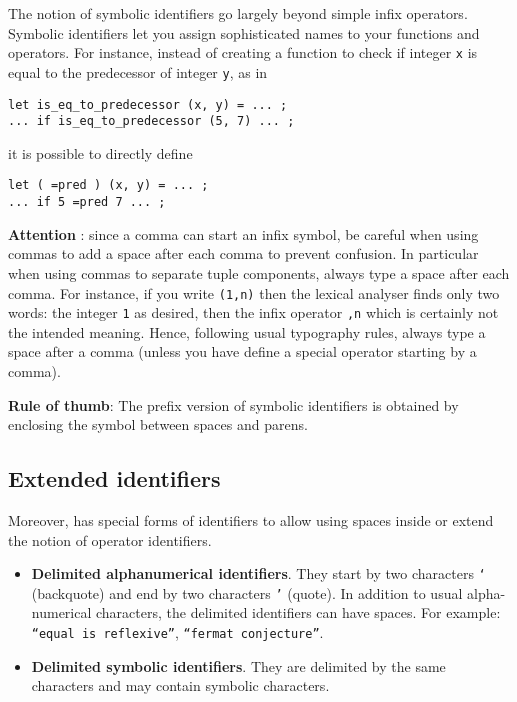 The {\focal} notion of symbolic identifiers go largely beyond simple
infix operators. Symbolic identifiers let you assign sophisticated names
to your functions and operators.
For instance, instead of creating a function to check if integer {\tt x}
is equal to the predecessor of integer {\tt y}, as in
{\scriptsize
\begin{lstlisting}
let is_eq_to_predecessor (x, y) = ... ;
... if is_eq_to_predecessor (5, 7) ... ;
\end{lstlisting}
}
it is possible to directly define
{\scriptsize
\begin{lstlisting}
let ( =pred ) (x, y) = ... ;
... if 5 =pred 7 ... ;
\end{lstlisting}
}

{\bf Attention} : since a comma can start an infix symbol, be careful
when using commas to add a space after each comma to prevent confusion.
In particular when using commas to separate tuple components, always type
a space after each comma. For instance, if you write {\tt (1,n)}
then the lexical analyser finds only two words: the integer {\tt 1} as
desired, then the infix operator {\tt ,n} which is certainly not the
intended meaning. Hence, following usual typography rules, always type a
space after a comma (unless you have define a special operator starting
by a comma).

{\bf Rule of thumb}: The prefix version of symbolic identifiers is obtained by enclosing the
symbol between spaces and parens.

\subsection{Extended identifiers}
\label{extended-identifiers}

Moreover, {\focal} has special forms of identifiers to allow using
spaces inside or extend the notion of operator identifiers.
\begin{itemize}
  \item {\bf Delimited alphanumerical identifiers}.
    They start by two characters {\tt `} (backquote) and end by two
    characters {\tt '} (quote). In addition to usual alpha-numerical
    characters, the delimited identifiers can have spaces. For example:
    {\tt ``equal is reflexive''}, {\tt ``fermat conjecture''}.
  \item {\bf Delimited symbolic identifiers}.
    They are delimited by the same characters and may contain symbolic characters.
\end{itemize}

